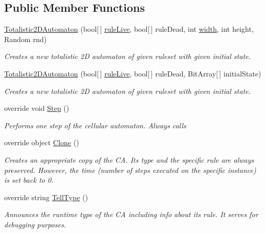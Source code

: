 \subsection*{Public Member Functions}
\begin{DoxyCompactItemize}
\item 
\hyperlink{class_cellular_1_1_totalistic2_d_automaton_a0a2cfd3f0c13cae481d0278630c71a0e}{Totalistic2\+D\+Automaton} (bool\mbox{[}$\,$\mbox{]} \hyperlink{class_cellular_1_1_totalistic2_d_automaton_a4752e3402c58243f7f342e21ddad3b05}{rule\+Live}, bool\mbox{[}$\,$\mbox{]} rule\+Dead, int \hyperlink{class_cellular_1_1_automaton2_d_a1e9e5ec637c747a859c346839c90d174}{width}, int height, Random rnd)
\begin{DoxyCompactList}\small\item\em Creates a new totalistic 2\+D automaton of given ruleset with given initial state. \end{DoxyCompactList}\item 
\hyperlink{class_cellular_1_1_totalistic2_d_automaton_a3a58155945c0ef836c06e5a568afe1a0}{Totalistic2\+D\+Automaton} (bool\mbox{[}$\,$\mbox{]} \hyperlink{class_cellular_1_1_totalistic2_d_automaton_a4752e3402c58243f7f342e21ddad3b05}{rule\+Live}, bool\mbox{[}$\,$\mbox{]} rule\+Dead, Bit\+Array\mbox{[}$\,$\mbox{]} initial\+State)
\begin{DoxyCompactList}\small\item\em Creates a new totalistic 2\+D automaton of given ruleset with given initial state. \end{DoxyCompactList}\item 
override void \hyperlink{class_cellular_1_1_totalistic2_d_automaton_a7f85cac5420f67a936cbd4cef33c4abc}{Step} ()
\begin{DoxyCompactList}\small\item\em Performs one step of the cellular automaton. Always calls \end{DoxyCompactList}\item 
override object \hyperlink{class_cellular_1_1_totalistic2_d_automaton_ae78cf4c3f8245adf64ec9a173330804f}{Clone} ()
\begin{DoxyCompactList}\small\item\em Creates an appropriate copy of the C\+A. Its type and the specific rule are always preserved. However, the time (number of steps executed on the specific instance) is set back to 0. \end{DoxyCompactList}\item 
override string \hyperlink{class_cellular_1_1_totalistic2_d_automaton_aa009c674cd109fa70173e9893f6d3b09}{Tell\+Type} ()
\begin{DoxyCompactList}\small\item\em Announces the runtime type of the C\+A including info about its rule. It serves for debugging purposes. \end{DoxyCompactList}\end{DoxyCompactItemize}

